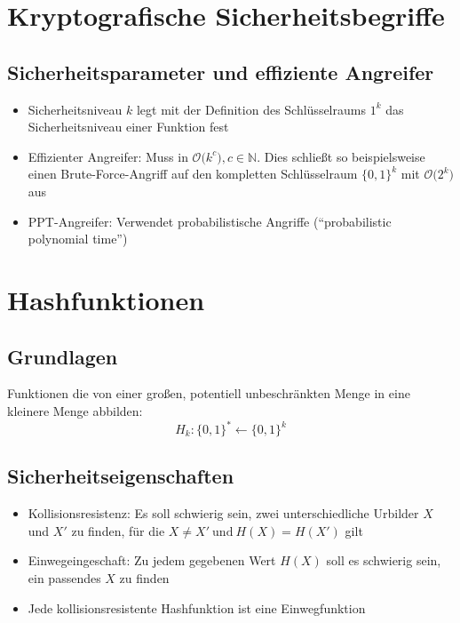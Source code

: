 \section{Kryptografische Sicherheitsbegriffe}

\subsection{Sicherheitsparameter und effiziente Angreifer}
\begin{itemize}
	\item Sicherheitsniveau \(k\) legt mit der Definition des Schlüsselraums \(1^k\) das Sicherheitsniveau einer Funktion fest
	\item Effizienter Angreifer: Muss in \(\mathcal{O}\big(k^c\big), c \in \mathbb{N}\). Dies schließt so beispielsweise einen Brute-Force-Angriff auf den kompletten Schlüsselraum \(\{0,1\}^k\) mit \(\mathcal{O}\big(2^k\big)\) aus
	\item PPT-Angreifer: Verwendet probabilistische Angriffe ("`probabilistic polynomial time"')
\end{itemize}



\section{Hashfunktionen}

\subsection{Grundlagen}
Funktionen die von einer großen, potentiell unbeschränkten Menge in eine kleinere Menge abbilden:
\[H_k : \{0,1\}^* \leftarrow \{0,1\}^k\]


\subsection{Sicherheitseigenschaften}
\begin{itemize}
	\item Kollisionsresistenz: Es soll schwierig sein, zwei unterschiedliche Urbilder \(X\) und \(X'\) zu finden, für die \(X \neq X'~\text{und}~H(X) = H(X')\) gilt
	\item Einwegeingeschaft: Zu jedem gegebenen Wert \(H(X)\) soll es schwierig sein, ein passendes \(X\) zu finden
	\item Jede kollisionsresistente Hashfunktion ist eine Einwegfunktion
\end{itemize}


